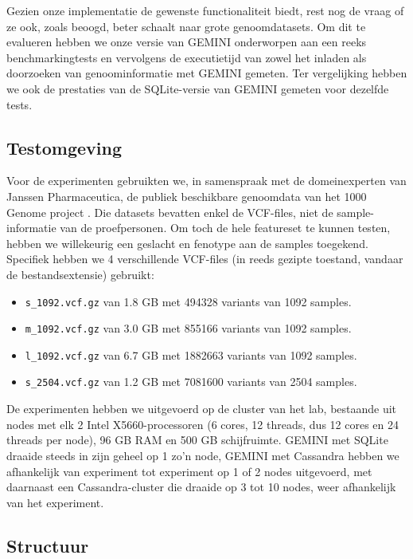 Gezien onze implementatie de gewenste functionaliteit biedt, rest nog de vraag of ze ook, zoals beoogd, beter schaalt naar grote genoomdatasets. Om dit te evalueren hebben we onze versie van GEMINI onderworpen aan een reeks benchmarkingtests en vervolgens de executietijd van zowel het inladen als doorzoeken van genoominformatie met GEMINI gemeten. Ter vergelijking hebben we ook de prestaties van de SQLite-versie van GEMINI gemeten voor dezelfde tests.

\subsection*{Testomgeving}

Voor de experimenten gebruikten we, in samenspraak met de domeinexperten van Janssen Pharmaceutica, de publiek beschikbare genoomdata van het 1000 Genome project \cite{10002012integrated}. Die datasets bevatten enkel de VCF-files, niet de sample-informatie van de proefpersonen. Om toch de hele featureset te kunnen testen, hebben we willekeurig een geslacht en fenotype aan de samples toegekend. Specifiek hebben we 4 verschillende VCF-files (in reeds gezipte toestand, vandaar de bestandsextensie) gebruikt:
\begin{itemize}
\item \texttt{s\_1092.vcf.gz} van 1.8 GB met 494328 variants van 1092 samples.
\item \texttt{m\_1092.vcf.gz} van 3.0 GB met 855166 variants van 1092 samples.
\item \texttt{l\_1092.vcf.gz} van 6.7 GB met 1882663 variants van 1092 samples.
\item \texttt{s\_2504.vcf.gz} van 1.2 GB met 7081600 variants van 2504 samples.
\end{itemize}

De experimenten hebben we uitgevoerd op de cluster van het lab, bestaande uit nodes met elk 2 Intel X5660-processoren (6 cores, 12 threads, dus 12 cores en 24 threads per node), 96 GB RAM en 500 GB schijfruimte. GEMINI met SQLite draaide steeds in zijn geheel op 1 zo'n node, GEMINI met Cassandra hebben we afhankelijk van experiment tot experiment op 1 of 2 nodes uitgevoerd, met daarnaast een Cassandra-cluster die draaide op 3 tot 10 nodes, weer afhankelijk van het experiment.

\subsection*{Structuur}

